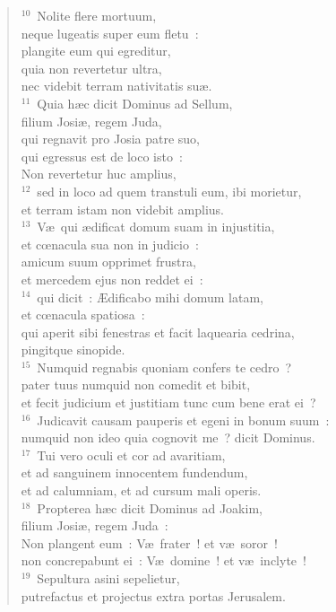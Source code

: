 \begin{verse}
${}^{10}$~Nolite flere mortuum,\\ neque lugeatis super eum fletu~:\\ plangite eum qui egreditur,\\ quia non revertetur ultra,\\ nec videbit terram nativitatis su\ae .\\
${}^{11}$~Quia h\ae c dicit Dominus ad Sellum,\\ filium Josi\ae , regem Juda,\\ qui regnavit pro Josia patre suo,\\ qui egressus est de loco isto~:\\ Non revertetur huc amplius,\\
${}^{12}$~sed in loco ad quem transtuli eum, ibi morietur,\\ et terram istam non videbit amplius.\\
${}^{13}$~V\ae\ qui \ae dificat domum suam in injustitia,\\ et cœnacula sua non in judicio~:\\ amicum suum opprimet frustra,\\ et mercedem ejus non reddet ei~:\\
${}^{14}$~qui dicit~: \AE dificabo mihi domum latam,\\ et cœnacula spatiosa~:\\ qui aperit sibi fenestras et facit laquearia cedrina,\\ pingitque sinopide.\\
${}^{15}$~Numquid regnabis quoniam confers te cedro~?\\ pater tuus numquid non comedit et bibit,\\ et fecit judicium et justitiam tunc cum bene erat ei~?\\
${}^{16}$~Judicavit causam pauperis et egeni in bonum suum~:\\ numquid non ideo quia cognovit me~? dicit Dominus.\\
${}^{17}$~Tui vero oculi et cor ad avaritiam,\\ et ad sanguinem innocentem fundendum,\\ et ad calumniam, et ad cursum mali operis.\\
${}^{18}$~Propterea h\ae c dicit Dominus ad Joakim,\\ filium Josi\ae , regem Juda~:\\ Non plangent eum~: V\ae\ frater~! et v\ae\ soror~!\\ non concrepabunt ei~: V\ae\ domine~! et v\ae\ inclyte~!\\
${}^{19}$~Sepultura asini sepelietur,\\ putrefactus et projectus extra portas Jerusalem.\end{verse}


